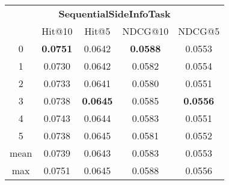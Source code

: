 \documentclass{article}
\begin{document}
 

\begin{tabular}{c|cccc}

\multicolumn{5}{c}{\textbf{SequentialSideInfoTask}} \\
\noalign{\smallskip}
\noalign{\smallskip}
\toprule
\multicolumn{1}{c}{Template ID}	&	\multicolumn{1}{|c}{Hit@10}	&	\multicolumn{1}{c}{Hit@5}	&	\multicolumn{1}{c}{NDCG@10}	&	\multicolumn{1}{c}{NDCG@5}\\
\midrule
0	&	\textbf{0.0751}	&	0.0642	&	\textbf{0.0588}	&	0.0553\\
1	&	0.0730	&	0.0642	&	0.0582	&	0.0554\\
2	&	0.0733	&	0.0641	&	0.0580	&	0.0551\\
3	&	0.0738	&	\textbf{0.0645}	&	0.0585	&	\textbf{0.0556}\\
4	&	0.0743	&	0.0644	&	0.0583	&	0.0551\\
5	&	0.0738	&	0.0645	&	0.0581	&	0.0552\\
\midrule
mean	&	0.0739	&	0.0643	&	0.0583	&	0.0553\\
max	&	0.0751	&	0.0645	&	0.0588	&	0.0556\\
\bottomrule

\end{tabular}
\end{document}
